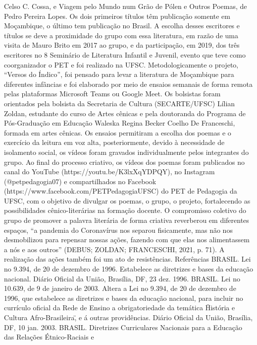 Celso C. Cossa, e Viagem pelo Mundo num Grão de Pólen e Outros Poemas, de Pedro Pereira
Lopes. Os dois primeiros títulos têm publicação somente em Moçambique, o último tem 
publicação no Brasil. A escolha desses escritores e títulos se deve a proximidade do grupo com 
essa literatura, em razão de uma visita de Mauro Brito em 2017 ao grupo, e da participação, em 
2019, dos três escritores no 8 Seminário de Literatura Infantil e Juvenil, evento que teve como 
coorganizador o PET e foi realizado na UFSC.
Metodologicamente o projeto, “Versos do Índico”, foi pensado para levar a literatura de 
Moçambique para diferentes infâncias e foi elaborado por meio de ensaios semanais de forma 
remota pelas plataformas Microsoft Teams ou Google Meet. Os bolsistas foram orientados pela 
bolsista da Secretaria de Cultura (SECARTE/UFSC) Lílian Zoldan, estudante do curso de Artes 
cênicas e pela doutoranda do Programa de Pós-Graduação em Educação Waleska Regina Becker 
Coelho De Franceschi, formada em artes cênicas. Os ensaios permitiram a escolha dos poemas e
o exercício da leitura em voz alta, posteriormente, devido à necessidade de isolamento social, os 
vídeos foram gravados individualmente pelos integrantes do grupo. Ao final do processo criativo, 
os vídeos dos poemas foram publicados no canal do YouTube (https://youtu.be/K3lxXqYDPQY), 
no Instagram (@petpedagogia07) e compartilhados no Facebook
(https://www.facebook.com/PETPedagogiaUFSC) do PET de Pedagogia da UFSC, com o 
objetivo de divulgar os poemas, o grupo, o projeto, fortalecendo as possibilidades cênico-literárias 
na formação docente.
O compromisso coletivo do grupo de promover a palavra literária de forma criativa 
reverberou em diferentes espaços, “a pandemia do Coronavírus nos separou fisicamente, mas não 
nos desmobilizou para repensar nossas ações, fazendo com que elas nos alimentassem a nós e aos 
outros” (DEBUS; ZOLDAN; FRANCESCHI, 2021, p. 71). A realização das ações também foi um 
ato de resistências.
Referências
BRASIL. Lei no
9.394, de 20 de dezembro de 1996. Estabelece as diretrizes e bases da educação 
nacional. Diário Oficial da União, Brasília, DF, 23 dez. 1996.
BRASIL. Lei no
10.639, de 9 de janeiro de 2003. Altera a Lei no 9.394, de 20 de dezembro de 
1996, que estabelece as diretrizes e bases da educação nacional, para incluir no currículo oficial 
da Rede de Ensino a obrigatoriedade da temática \"História e Cultura Afro-Brasileira\", e á outras 
providências. Diário Oficial da União, Brasília, DF, 10 jan. 2003.
BRASIL. Diretrizes Curriculares Nacionais para a Educação das Relações Étnico-Raciais e 
